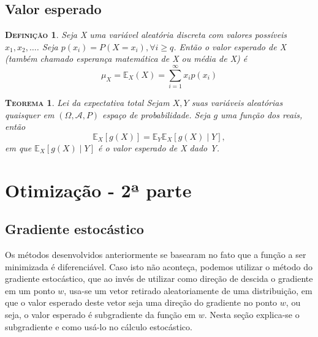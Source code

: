 \documentclass[
	12pt,				%
    oneside,			%
	a4paper,			%
	english,			%
	french,				%
	spanish,			%
	brazil,				%
	]{abntex2}
\newtheorem{theorem}{\scshape Teorema}[section]
\newtheorem{definicao}{\scshape Defini\c{c}\~ao}[section]
\begin{document}
    \section{Valor esperado}
        \begin{definicao}
            Seja X uma variável aleatória discreta com valores possíveis $x_1,x_2,\dots$. Seja $p(x_i) = P(X=x_i),\forall i \geq q$. Então o valor esperado de X (também chamado esperança matemática de X ou média de X) é
                \begin{equation*}
                    \mu_X = \mathbb{E}_X(X) = \sum_{i=1}^{\infty}x_ip(x_i)
                \end{equation*}
        \end{definicao}

        \begin{theorem}{Lei da expectativa total}
            Sejam $X,Y$ suas variáveis aleatórias quaisquer em $\left(\Omega, \mathcal{A}, P\right)$ espaço de probabilidade. Seja $g$ uma função dos reais, então
            \begin{equation*}
                \mathbb{E}_X[g(X)] = \mathbb{E}_Y\mathbb{E}_{X}[g(X)\mid Y],
            \end{equation*}
            em que $\mathbb{E}_X[g(X)\mid Y]$ é o valor esperado de X dado Y.
        \end{theorem}

\chapter{Otimização - 2ª parte}
    \section{Gradiente estocástico}
        Os métodos desenvolvidos anteriormente se basearam no fato que a função a ser minimizada é diferenciável. Caso isto não aconteça, podemos utilizar o método do gradiente estocástico, que ao invés de utilizar como direção de descida o gradiente em um ponto $w$, usa-se um vetor retirado aleatoriamente de uma distribuição, em que o valor esperado deste vetor seja uma direção do gradiente no ponto $w$, ou seja, o valor esperado é subgradiente da função em $w$.
        Nesta seção explica-se o subgradiente e como usá-lo no cálculo estocástico.
\end{document}
